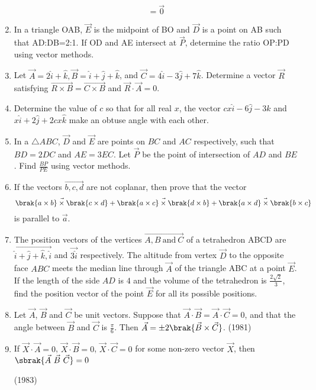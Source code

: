 \begin{enumerate}[label=\thesubsection.\arabic*.,ref=\thesubsection.\theenumi]
$${ }=\vec{0}
		$$ \hfill{}
	\fi
	\item In a triangle OAB, $\vec{E}$ is the midpoint of BO and $\vec{D}$ is a point on AB such that AD:DB=2:1. If OD and AE intersect at $\vec{P}$, determine the ratio OP:PD  using vector methods. \hfill{}
	\item Let $\vec{A}=2\hat{i}+\hat{k},\vec{B}=\hat{i}+\hat{j}+\hat{k}$, and $\vec{C}=4\hat{i}-3\hat{j}+7\hat{k}$. Determine a vector $\vec{R}$ satisfying $\vec{R\times B}=\vec{C\times B}$ and $\vec{R}\cdot\vec{A}=0$. \hfill{}
	\item Determine the value of $c$ so that for all real $x$, the vector $cx\hat{i}-6\hat{j}-3\hat{k}$ and $x\hat{i}+2\hat{j}+2cx\hat{k}$ make an obtuse angle with each other. \hfill{}
	\item In a $\triangle ABC$, $\vec{D}$ and $\vec{E}$ are points on $BC$ and $AC$ respectively, such that $BD=2DC$ and $AE=3EC$. Let $\vec{P}$ be the point of intersection of $AD$ and $BE$. Find $\frac{BP}{PE}$ using vector methods. \hfill{}
	\item If the vectors $\vec{b,c,d}$ are not coplanar, then prove that the vector $$\vec{\brak{a\times b}\times\brak{c\times d}}+\vec{\brak{a\times c}\times\brak{d\times b}}+\vec{\brak{a\times d}\times\brak{b\times c}}$$ is parallel to $\vec{a}$. \hfill{}
	\item The position vectors of the vertices $\vec{A,B\ \text{and}\ C}$ of a tetrahedron ABCD are $\vec{\hat{i}+\hat{j}+\hat{k},\hat{i}}$ and $\vec{3\hat{i}}$ respectively. The altitude from vertex $\vec{D}$ to the opposite face $ABC$ meets the median line through $\vec{A}$ of the triangle ABC at a point $\vec{E}$. If the length of the side $AD$ is $4$ and the volume of the tetrahedron is $\frac{2\sqrt{2}}{3}$, find the position vector of the point $\vec{E}$ for all its possible positions. \hfill{}
\item Let $\vec{A}$, $\vec{B}$ and $\vec{C}$ be unit vectors. Suppose that $\vec{A}\cdot\vec{B} = \vec{A}\cdot\vec{C}=0$, and that the angle between $\vec{B}$ and $\vec{C}$ is $\frac{\pi}{6}$. Then $\vec{A}=\pm2\brak{\vec{B}\times\vec{C}}$.
\hfill (1981)
\item If $\vec{X}\cdot\vec{A}=0$, $\vec{X}\cdot\vec{B}=0$, $\vec{X}\cdot\vec{C}=0$ for some non-zero vector $\vec{X}$, then $\sbrak{\vec{A}\ \vec{B}\ \vec{C}}=0$

\hfill (1983)


\end{enumerate}
